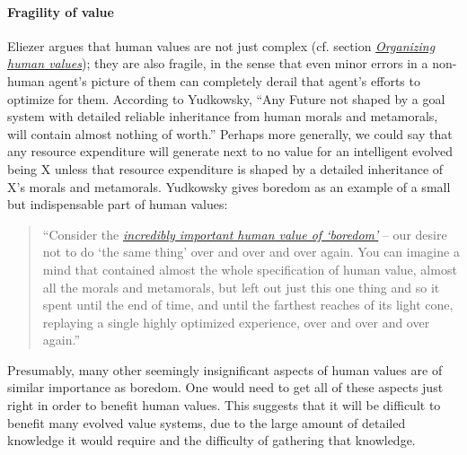 \hypertarget{fragility-of-value}{\paragraph{Fragility of
value}\label{fragility-of-value}}

Eliezer \parencite{Yudkowsky2015-tz} argues that human
values are not just complex (cf. section
\protect\hyperlink{_10rj5m9uynoa}{\emph{Organizing human values}});
they are also fragile, in the sense that even minor errors in a
non-human agent's picture of them can completely derail that agent's
efforts to optimize for them. According to Yudkowsky, ``Any Future not
shaped by a goal system with detailed reliable inheritance from human
morals and metamorals, will contain almost nothing of worth.'' Perhaps
more generally, we could say that any resource expenditure will generate
next to no value for an intelligent evolved being X unless that resource
expenditure is shaped by a detailed inheritance of X's morals and
metamorals. Yudkowsky gives boredom as an example of a small but
indispensable part of human values:

\begin{quote}
``Consider the
\href{http://lesswrong.com/lw/xr/in_praise_of_boredom/}{\emph{incredibly
important human value of `boredom'}} -- our desire not to do `the same
thing' over and over and over again. You can imagine a mind that
contained almost the whole specification of human value, almost all the
morals and metamorals, but left out just this one thing and so it spent
until the end of time, and until the farthest reaches of its light cone,
replaying a single highly optimized experience, over and over and over
again.''
\end{quote}

Presumably, many other seemingly insignificant aspects of human values
are of similar importance as boredom. One would need to get all of these
aspects just right in order to benefit human values. This suggests that
it will be difficult to benefit many evolved value systems, due to the
large amount of detailed knowledge it would require and the difficulty
of gathering that knowledge.

